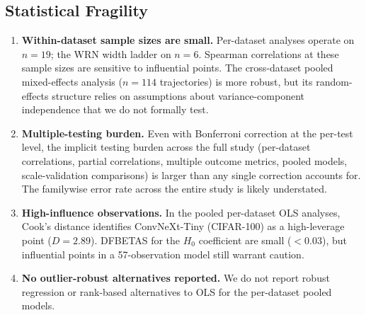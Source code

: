 \documentclass[10pt,twocolumn]{article}
\begin{document}
\subsection{Statistical Fragility}
\begin{enumerate}
    \item \textbf{Within-dataset sample sizes are small.} Per-dataset analyses operate on $n = 19$; the WRN width ladder on $n = 6$. Spearman correlations at these sample sizes are sensitive to influential points. The cross-dataset pooled mixed-effects analysis ($n = 114$ trajectories) is more robust, but its random-effects structure relies on assumptions about variance-component independence that we do not formally test.
    \item \textbf{Multiple-testing burden.} Even with Bonferroni correction at the per-test level, the implicit testing burden across the full study (per-dataset correlations, partial correlations, multiple outcome metrics, pooled models, scale-validation comparisons) is larger than any single correction accounts for. The familywise error rate across the entire study is likely understated.
    \item \textbf{High-influence observations.} In the pooled per-dataset OLS analyses, Cook's distance identifies ConvNeXt-Tiny (CIFAR-100) as a high-leverage point ($D = 2.89$). DFBETAS for the $H_0$ coefficient are small ($< 0.03$), but influential points in a 57-observation model still warrant caution.
    \item \textbf{No outlier-robust alternatives reported.} We do not report robust regression or rank-based alternatives to OLS for the per-dataset pooled models.
\end{enumerate}
\end{document}
